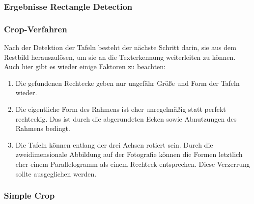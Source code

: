 \subsubsection{Ergebnisse Rectangle Detection}

\subsubsection{Crop-Verfahren}

Nach der Detektion der Tafeln besteht der nächste Schritt darin, sie aus dem Restbild herauszulösen, um sie an die Texterkennung weiterleiten zu können. Auch hier gibt es wieder einige Faktoren zu beachten:
\begin{enumerate}
\item Die gefundenen Rechtecke geben nur ungefähr Größe und Form der Tafeln wieder.
\item Die eigentliche Form des Rahmens ist eher unregelmäßig statt perfekt rechteckig. Das ist durch die abgerundeten Ecken sowie Abnutzungen des Rahmens bedingt.
\item Die Tafeln können entlang der drei Achsen rotiert sein. Durch die zweidimensionale Abbildung auf der Fotografie können die Formen letztlich eher einem Parallelogramm als einem Rechteck entsprechen. Diese Verzerrung sollte ausgeglichen werden.
\end{enumerate}


\subsubsection*{Simple Crop}


